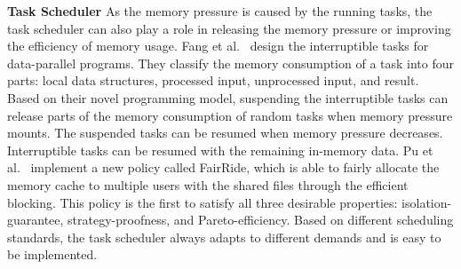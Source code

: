 \textbf{Task Scheduler} As the memory pressure is caused by the running tasks, the task scheduler can also play a role in releasing the memory pressure or improving the efficiency of memory usage. Fang et al.~\cite{fang2015interruptible} design the interruptible tasks for data-parallel programs. They classify the memory consumption of a task into four parts: local data structures, processed input, unprocessed input, and result. Based on their novel programming model, suspending the interruptible tasks can release parts of the memory consumption of random tasks when memory pressure mounts. The suspended tasks can be resumed when memory pressure decreases. Interruptible tasks can be resumed with the remaining in-memory data. Pu et al.~\cite{pu2016fairride} implement a new policy called FairRide, which  is able to fairly allocate the memory cache to multiple users with the shared files through the efficient blocking. This policy is the first to satisfy all three desirable properties: isolation-guarantee, strategy-proofness, and Pareto-efficiency. Based on different scheduling standards, the task scheduler always adapts to different demands and is easy to be implemented.
